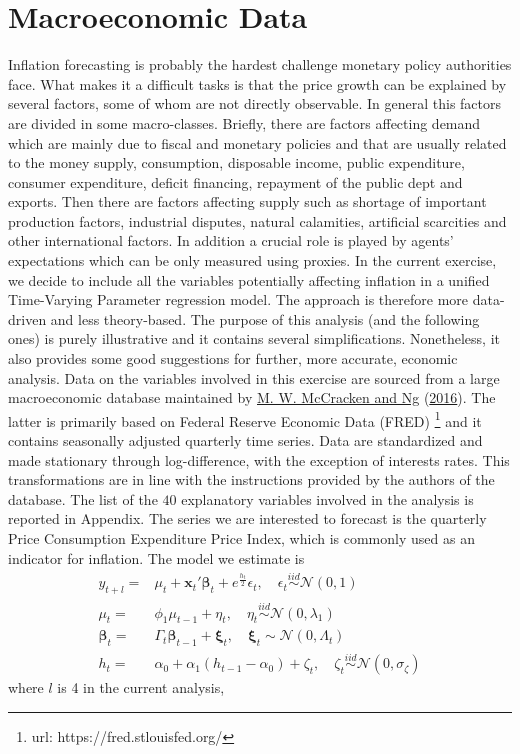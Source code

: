 \documentclass[
  12pt,
]{book}
\theoremstyle{break}
\theoremstyle{nonumberplain}
\begin{document}
\section{Macroeconomic Data}

Inflation forecasting is probably the hardest challenge monetary policy
authorities face. What makes it a difficult tasks is that the price
growth can be explained by several factors, some of whom are not
directly observable. In general this factors are divided in some
macro-classes. Briefly, there are factors affecting demand which are
mainly due to fiscal and monetary policies and that are usually related
to the money supply, consumption, disposable income, public expenditure,
consumer expenditure, deficit financing, repayment of the public dept
and exports. Then there are factors affecting supply such as shortage of
important production factors, industrial disputes, natural calamities,
artificial scarcities and other international factors. In addition a
crucial role is played by agents' expectations which can be only
measured using proxies. In the current exercise, we decide to include
all the variables potentially affecting inflation in a unified
Time-Varying Parameter regression model. The approach is therefore more
data-driven and less theory-based. The purpose of this analysis (and the
following ones) is purely illustrative and it contains several
simplifications. Nonetheless, it also provides some good suggestions for
further, more accurate, economic analysis. Data on the variables
involved in this exercise are sourced from a large macroeconomic
database maintained by \protect\hyperlink{ref-FREDMD}{M. W. McCracken
and Ng} (\protect\hyperlink{ref-FREDMD}{2016}). The latter is primarily
based on Federal Reserve Economic Data (FRED)
\footnote{url: https://fred.stlouisfed.org/} and it contains seasonally
adjusted quarterly time series. Data are standardized and made
stationary through log-difference, with the exception of interests
rates. This transformations are in line with the instructions provided
by the authors of the database. The list of the \(40\) explanatory
variables involved in the analysis is reported in Appendix. The series
we are interested to forecast is the quarterly Price Consumption
Expenditure Price Index, which is commonly used as an indicator for
inflation. The model we estimate is \begin{align*}
y_{t+l}= & \mu_t+\boldsymbol{x}_{t}'\boldsymbol{\beta}_{t}+e^{\frac{h_t}{2}}\epsilon_{t}, \quad \epsilon_{t}\overset{iid}{\sim}\mathcal{N}(0,1) \\
\mu_t = & \phi_{1}\mu_{t-1}+\eta_{t}, \quad \eta_{t}\overset{iid}{\sim}\mathcal{N}(0,\lambda_1) \\
\boldsymbol{\beta}_{t} = & \Gamma_{t}\boldsymbol{\beta}_{t-1} + \boldsymbol{\xi}_{t}, \quad \boldsymbol{\xi}_{t}\sim\mathcal{N}(0,\Lambda_t) \\
h_{t}= & \alpha_0+\alpha_{1}(h_{t-1}-\alpha_{0})+\zeta_{t}, \quad \zeta_{t}\overset{iid}{\sim}\mathcal{N}(0,\sigma_{\zeta})
\end{align*} where \(l\) is 4 in the current analysis,
\end{document}
